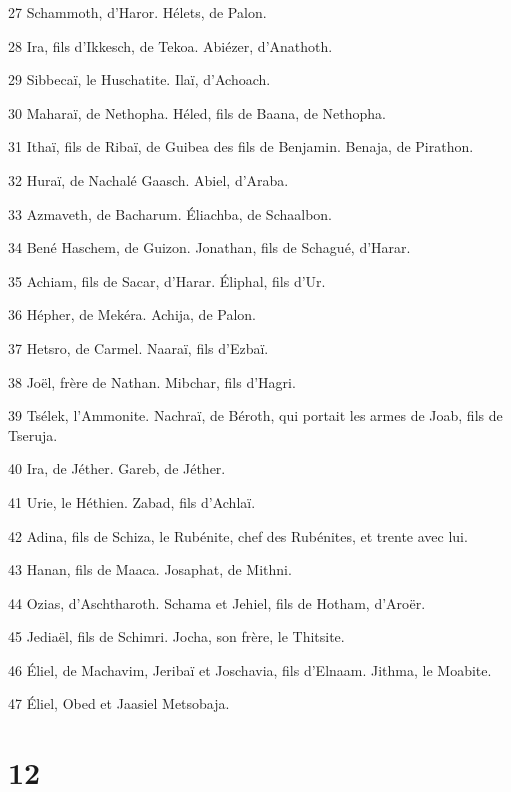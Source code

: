 \par 27 Schammoth, d'Haror. Hélets, de Palon.
\par 28 Ira, fils d'Ikkesch, de Tekoa. Abiézer, d'Anathoth.
\par 29 Sibbecaï, le Huschatite. Ilaï, d'Achoach.
\par 30 Maharaï, de Nethopha. Héled, fils de Baana, de Nethopha.
\par 31 Ithaï, fils de Ribaï, de Guibea des fils de Benjamin. Benaja, de Pirathon.
\par 32 Huraï, de Nachalé Gaasch. Abiel, d'Araba.
\par 33 Azmaveth, de Bacharum. Éliachba, de Schaalbon.
\par 34 Bené Haschem, de Guizon. Jonathan, fils de Schagué, d'Harar.
\par 35 Achiam, fils de Sacar, d'Harar. Éliphal, fils d'Ur.
\par 36 Hépher, de Mekéra. Achija, de Palon.
\par 37 Hetsro, de Carmel. Naaraï, fils d'Ezbaï.
\par 38 Joël, frère de Nathan. Mibchar, fils d'Hagri.
\par 39 Tsélek, l'Ammonite. Nachraï, de Béroth, qui portait les armes de Joab, fils de Tseruja.
\par 40 Ira, de Jéther. Gareb, de Jéther.
\par 41 Urie, le Héthien. Zabad, fils d'Achlaï.
\par 42 Adina, fils de Schiza, le Rubénite, chef des Rubénites, et trente avec lui.
\par 43 Hanan, fils de Maaca. Josaphat, de Mithni.
\par 44 Ozias, d'Aschtharoth. Schama et Jehiel, fils de Hotham, d'Aroër.
\par 45 Jediaël, fils de Schimri. Jocha, son frère, le Thitsite.
\par 46 Éliel, de Machavim, Jeribaï et Joschavia, fils d'Elnaam. Jithma, le Moabite.
\par 47 Éliel, Obed et Jaasiel Metsobaja.

\chapter{12}

